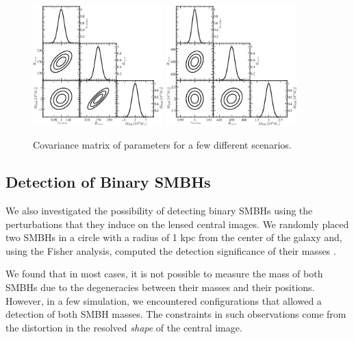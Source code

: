\documentclass[chicago]{emulateapj}
\begin{document}
\begin{figure}
\begin{center}
\centering
\includegraphics[trim= 0 0 0 0, width=0.45\textwidth]{figures/f_04_A.eps}
\includegraphics[trim= 0 0 0 0, width=0.45\textwidth]{figures/f_04_B.eps}
\centering
\end{center}
\caption{ Covariance matrix of parameters for a few different scenarios.
\label{fig:4}}
\end{figure}


\subsection{Detection of Binary SMBHs}
We also investigated the possibility of detecting binary SMBHs using the perturbations that they induce on the lensed central images. 
We randomly placed two SMBHs in a circle with a radius of 1 kpc from the center of the galaxy and, using the Fisher analysis, computed the detection significance of their masses .

We found that in most cases, it is not possible to measure the mass of both SMBHs due to the degeneracies between their masses and their positions.
However, in a few simulation, we encountered configurations that allowed a detection of both SMBH masses. The constraints in such observations come from the distortion in the resolved \emph{shape} of the central image.

\end{document}
